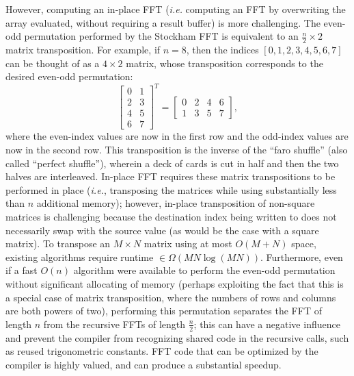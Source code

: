 \documentclass[10pt]{article}
\begin{document}
However, computing an in-place FFT (\emph{i.e.} computing an FFT by
overwriting the array evaluated, without requiring a result buffer) is
more challenging. The even-odd permutation performed by the Stockham
FFT is equivalent to an $\frac{n}{2} \times 2$ matrix
transposition. For example, if $n=8$, then the indices $[0, 1, 2, 3,
  4, 5, 6, 7]$ can be thought of as a $4 \times 2$ matrix, whose
transposition corresponds to the desired even-odd permutation:
\[ 
\left[
  \begin{matrix}
    0 & 1\\
    2 & 3\\
    4 & 5\\
    6 & 7
  \end{matrix}
\right]^T = 
\left[
  \begin{matrix}
    0 & 2 & 4 & 6\\
    1 & 3 & 5 & 7
  \end{matrix}
\right],
\]
where the even-index values are now in the first row and the odd-index
values are now in the second row. This transposition is the inverse of
the ``faro shuffle'' (also called ``perfect
shuffle'')\cite{sedgewick:algorithms}, wherein a deck of cards is cut
in half and then the two halves are interleaved. In-place FFT requires
these matrix transpositions to be performed in place (\emph{i.e.},
transposing the matrices while using substantially less than $n$
additional memory); however, in-place transposition of non-square
matrices is challenging because the destination index being written to
does not necessarily swap with the source value (as would be the case
with a square matrix). To transpose an $M \times N$ matrix using at
most $O(M + N)$ space, existing algorithms require runtime $\in
\Omega(M N \log(M N))$\cite{fich:permuting}. Furthermore, even if a
fast $O(n)$ algorithm were available to perform the even-odd
permutation without significant allocating of memory (perhaps
exploiting the fact that this is a special case of matrix
transposition, where the numbers of rows and columns are both powers
of two), performing this permutation separates the FFT of length $n$
from the recursive FFTs of length $\frac{n}{2}$; this can have a
negative influence and prevent the compiler from recognizing shared
code in the recursive calls, such as reused trigonometric
constants. FFT code that can be optimized by the compiler is highly
valued, and can produce a substantial speedup\cite{myrnyy:simple}.
\end{document}
